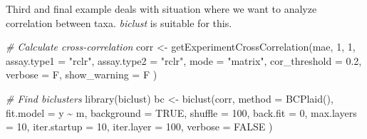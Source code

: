 \documentclass[
]{book}
\newenvironment{Shaded}{\begin{snugshade}}{\end{snugshade}}
\newcommand{\AttributeTok}[1]{\textcolor[rgb]{0.77,0.63,0.00}{#1}}
\newcommand{\CommentTok}[1]{\textcolor[rgb]{0.56,0.35,0.01}{\textit{#1}}}
\newcommand{\ConstantTok}[1]{\textcolor[rgb]{0.00,0.00,0.00}{#1}}
\newcommand{\DecValTok}[1]{\textcolor[rgb]{0.00,0.00,0.81}{#1}}
\newcommand{\FloatTok}[1]{\textcolor[rgb]{0.00,0.00,0.81}{#1}}
\newcommand{\FunctionTok}[1]{\textcolor[rgb]{0.00,0.00,0.00}{#1}}
\newcommand{\NormalTok}[1]{#1}
\newcommand{\OtherTok}[1]{\textcolor[rgb]{0.56,0.35,0.01}{#1}}
\newcommand{\SpecialCharTok}[1]{\textcolor[rgb]{0.00,0.00,0.00}{#1}}
\newcommand{\StringTok}[1]{\textcolor[rgb]{0.31,0.60,0.02}{#1}}
\begin{document}
Third and final example deals with situation where we want to analyze
correlation between taxa. \emph{biclust} is suitable for this.

\begin{Shaded}
\begin{Highlighting}[]
\CommentTok{\# Calculate cross{-}correlation}
\NormalTok{corr }\OtherTok{\textless{}{-}} \FunctionTok{getExperimentCrossCorrelation}\NormalTok{(mae, }\DecValTok{1}\NormalTok{, }\DecValTok{1}\NormalTok{,}
  \AttributeTok{assay.type1 =} \StringTok{"rclr"}\NormalTok{, }\AttributeTok{assay.type2 =} \StringTok{"rclr"}\NormalTok{,}
  \AttributeTok{mode =} \StringTok{"matrix"}\NormalTok{,}
  \AttributeTok{cor\_threshold =} \FloatTok{0.2}\NormalTok{, }\AttributeTok{verbose =}\NormalTok{ F, }\AttributeTok{show\_warning =}\NormalTok{ F}
\NormalTok{)}

\CommentTok{\# Find biclusters}
\FunctionTok{library}\NormalTok{(biclust)}
\NormalTok{bc }\OtherTok{\textless{}{-}} \FunctionTok{biclust}\NormalTok{(corr,}
  \AttributeTok{method =} \FunctionTok{BCPlaid}\NormalTok{(), }\AttributeTok{fit.model =}\NormalTok{ y }\SpecialCharTok{\textasciitilde{}}\NormalTok{ m,}
  \AttributeTok{background =} \ConstantTok{TRUE}\NormalTok{, }\AttributeTok{shuffle =} \DecValTok{100}\NormalTok{, }\AttributeTok{back.fit =} \DecValTok{0}\NormalTok{, }\AttributeTok{max.layers =} \DecValTok{10}\NormalTok{,}
  \AttributeTok{iter.startup =} \DecValTok{10}\NormalTok{, }\AttributeTok{iter.layer =} \DecValTok{100}\NormalTok{, }\AttributeTok{verbose =} \ConstantTok{FALSE}
\NormalTok{)}
\end{Highlighting}
\end{Shaded}

\begin{Shaded}
\end{Shaded}
\end{document}
